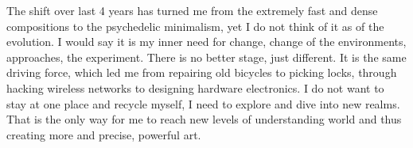 \documentclass[12pt,a4paper,oneside]{report}
\begin{document}
The shift over last 4 years has turned me from the extremely fast and dense compositions to the psychedelic minimalism, yet I do not think of it as of the evolution. I would say it is my inner need for change, change of the environments, approaches, the experiment. There is no better stage, just different. It is the same driving force, which led me from repairing old bicycles to picking locks, through hacking wireless networks to designing hardware electronics. I do not want to stay at one place and recycle myself, I need to explore and dive into new realms. That is the only way for me to reach new levels of understanding world and thus creating more and precise, powerful art.

\onehalfspacing

 


\appendix


\end{document}

